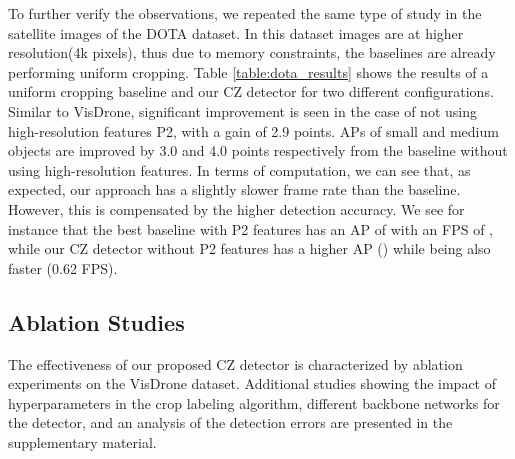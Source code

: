 To further verify the observations, we repeated the same type of study in the satellite images of the DOTA dataset. In this dataset images are at higher resolution(4k pixels), thus due to memory constraints, the baselines are already performing uniform cropping. Table \ref{table:dota_results} shows the results of a uniform cropping baseline and our CZ detector for two different configurations. Similar to VisDrone, significant improvement is seen in the case of not using high-resolution features P2, with a gain of 2.9 points. APs of small and medium objects are improved by 3.0 and 4.0 points respectively from the baseline without using high-resolution features. In terms of computation, we can see that, as expected, our approach has a slightly slower frame rate than the baseline. However, this is compensated by the higher detection accuracy. We see for instance that the best baseline with P2 features has an AP of  with an FPS of , while our CZ detector without P2 features has a higher AP () while being also faster (0.62 FPS).
\begin{table}
    \centering
    \caption{Performance comparison of our method against baselines on DOTA dataset (4K pixel resolution).}
    \label{table:dota_results}
\end{table}

\subsection{Ablation Studies}



The effectiveness of our proposed CZ detector is characterized by ablation experiments on the VisDrone dataset. Additional studies showing the impact of hyperparameters in the crop labeling algorithm, different backbone networks for the detector, and an analysis of the detection errors are presented in the supplementary material.

